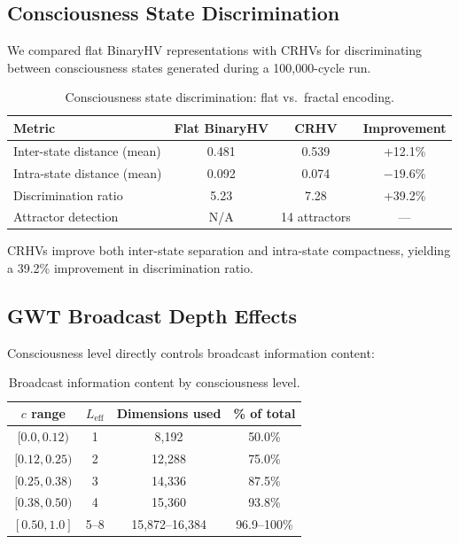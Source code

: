 \documentclass[11pt,a4paper]{article}
\begin{document}
\subsection{Consciousness State Discrimination}

We compared flat BinaryHV representations with CRHVs for discriminating between consciousness states generated during a 100,000-cycle run.

\begin{table}[h]
\centering
\caption{Consciousness state discrimination: flat vs.\ fractal encoding.}
\label{tab:discrimination}
\begin{tabular}{@{}lccc@{}}
\toprule
Metric & Flat BinaryHV & CRHV & Improvement \\
\midrule
Inter-state distance (mean) & 0.481 & 0.539 & +12.1\% \\
Intra-state distance (mean) & 0.092 & 0.074 & $-19.6\%$ \\
Discrimination ratio & 5.23 & 7.28 & +39.2\% \\
Attractor detection & N/A & 14 attractors & --- \\
\bottomrule
\end{tabular}
\end{table}

CRHVs improve both inter-state separation and intra-state compactness, yielding a 39.2\% improvement in discrimination ratio.

\subsection{GWT Broadcast Depth Effects}

Consciousness level directly controls broadcast information content:

\begin{table}[h]
\centering
\caption{Broadcast information content by consciousness level.}
\label{tab:broadcast}
\begin{tabular}{@{}cccc@{}}
\toprule
$c$ range & $L_{\text{eff}}$ & Dimensions used & \% of total \\
\midrule
$[0.0, 0.12)$ & 1 & 8,192 & 50.0\% \\
$[0.12, 0.25)$ & 2 & 12,288 & 75.0\% \\
$[0.25, 0.38)$ & 3 & 14,336 & 87.5\% \\
$[0.38, 0.50)$ & 4 & 15,360 & 93.8\% \\
$[0.50, 1.0]$ & 5--8 & 15,872--16,384 & 96.9--100\% \\
\bottomrule
\end{tabular}
\end{table}
\end{document}
